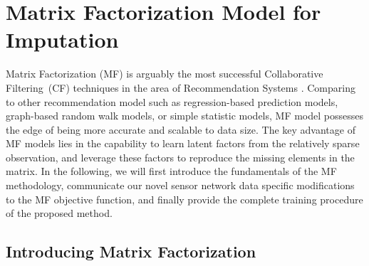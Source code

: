 \section{Matrix Factorization Model for Imputation}  \label{sec:mf}


Matrix Factorization (MF) is arguably the most successful Collaborative Filtering~(CF) techniques in the area of Recommendation Systems \cite{koren2009bellkor, piotte2009pragmatic, toscher2009bigchaos, chen2011linear}. Comparing to other recommendation model such as regression-based prediction models, graph-based random walk models, or simple statistic models, MF model possesses the edge of being more accurate and scalable to data size.
The key advantage of MF models lies in the capability to learn latent factors from the relatively sparse observation, and leverage these factors to reproduce the missing elements in the matrix.
In the following, we will first introduce the fundamentals of the MF methodology, communicate our novel sensor network data specific modifications to the MF objective function, and finally provide the complete training procedure of the proposed method.

\subsection{Introducing Matrix Factorization}

